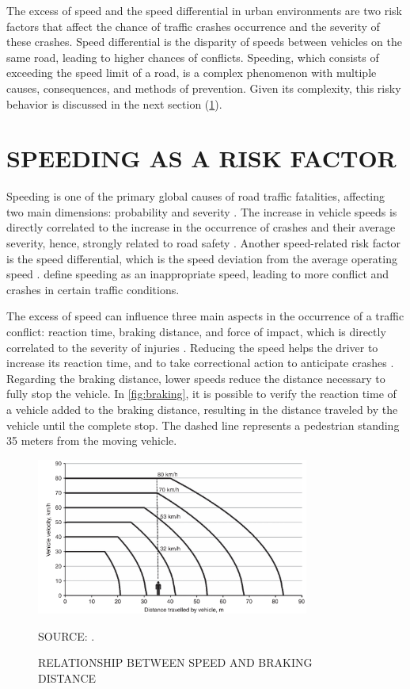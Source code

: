 The excess of speed and the speed differential in urban environments are two risk factors that affect the chance of traffic crashes occurrence and the severity of these crashes. Speed differential is the disparity of speeds between vehicles on the same road, leading to higher chances of conflicts. Speeding, which consists of exceeding the speed limit of a road, is a complex phenomenon with multiple causes, consequences, and methods of prevention. Given its complexity, this risky behavior is discussed in the next section (\ref{speeding}). 

\section{SPEEDING AS A RISK FACTOR} \label{speeding}

Speeding is one of the primary global causes of road traffic fatalities, affecting two main dimensions: probability and severity \cite{WHO2013}. The increase in vehicle speeds is directly correlated to the increase in the occurrence of crashes and their average severity, hence, strongly related to road safety \cite{Mohan2016a}. Another speed-related risk factor is the speed differential, which is the speed deviation from the average operating speed \cite{Shinar2017}. \textcite{Ferraz2012} define speeding as an inappropriate speed, leading to more conflict and crashes in certain traffic conditions. 

The excess of speed can influence three main aspects in the occurrence of a traffic conflict: reaction time, braking distance, and force of impact, which is directly correlated to the severity of injuries \cite{Mohan2016a}. Reducing the speed helps the driver to increase its reaction time, and to take correctional action to anticipate crashes \cite{Elvik2009}. Regarding the braking distance, lower speeds reduce the distance necessary to fully stop the vehicle. In \autoref{fig:braking}, it is possible to verify the reaction time of a vehicle added to the braking distance, resulting in the distance traveled by the vehicle until the complete stop. The dashed line represents a pedestrian standing 35 meters from the moving vehicle. 

\begin{figure}[!htbp]
    \centering\footnotesize
    \captionsetup{font=footnotesize}
    \caption{RELATIONSHIP BETWEEN SPEED AND BRAKING DISTANCE}
    \includegraphics[width=0.8\textwidth]{fig/braking2.png}
    \label{fig:braking}
    \par SOURCE: \textcite{Mohan2016a}.
\end{figure} 

